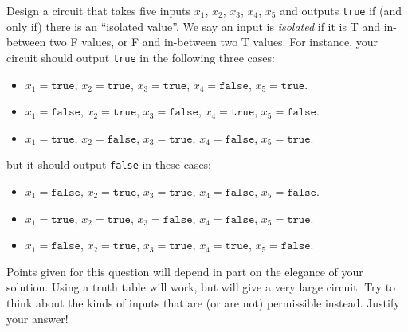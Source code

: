 \item  Design  a circuit that  takes five inputs $x_1$,  $x_2$, $x_3$, $x_4$,  $x_5$ and
  outputs \texttt  {true} if (and only  if) there is an ``isolated value''. We say an input is {\em isolated}
  if it is T and in-between two F values, or F and in-between two T values. 
 For instance, your  circuit should output  \texttt {true} in  the following
  three cases:
  \begin{itemize}
  \item  $x_1   =  \texttt{true}$,   $x_2  =   \texttt{true}$,  $x_3   =  \texttt{true}$,
    $x_4 = \texttt{false}$, $x_5 = \texttt{true}$.
  \item  $x_1   =  \texttt{false}$,  $x_2   =  \texttt{true}$,  $x_3   =  \texttt{false}$,
    $x_4 = \texttt{true}$, $x_5 = \texttt{false}$.
  \item  $x_1   =  \texttt{true}$,  $x_2   =  \texttt{false}$,  $x_3   =  \texttt{true}$,
    $x_4 = \texttt{false}$, $x_5 = \texttt{true}$.
  \end{itemize}
  but it should output \texttt {false} in these cases:
  \begin{itemize}
  \item  $x_1   =  \texttt{false}$,   $x_2  =   \texttt{true}$,  $x_3   =  \texttt{true}$,
    $x_4 = \texttt{false}$, $x_5 = \texttt{false}$.
  \item  $x_1   =  \texttt{true}$,   $x_2  =   \texttt{true}$,  $x_3   =  \texttt{false}$,
    $x_4 = \texttt{false}$, $x_5 = \texttt{true}$.
  \item   $x_1  =   \texttt{false}$,  $x_2   =  \texttt{true}$,   $x_3  =   \texttt{true}$,
    $x_4 = \texttt{true}$, $x_5 = \texttt{false}$.
  \end{itemize}
  Points given  for this question will  depend in part  on the elegance of  your solution.
  Using a truth  table will work, but will  give a very large circuit. Try  to think about
  the kinds of inputs that are (or are not) permissible instead. Justify your answer!
    \newpage